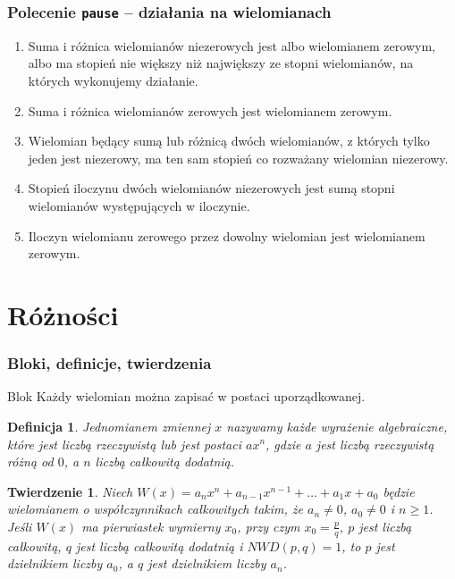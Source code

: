 \documentclass[10pt,xcolor={dvipsnames}]{beamer}
\newtheorem{twierdzenie}{Twierdzenie}
\newtheorem{definicja}{Definicja}
\begin{document}
\begin{frame}[fragile]
\frametitle{Polecenie \texttt{pause} -- działania na wielomianach}
\begin{enumerate}
\item Suma i różnica wielomianów niezerowych jest albo wielomianem zerowym, albo ma stopień nie większy niż największy ze stopni wielomianów, na których wykonujemy działanie.
\pause
\item  Suma i różnica wielomianów zerowych jest wielomianem zerowym.
\pause
\item Wielomian będący sumą lub różnicą dwóch wielomianów, z których tylko jeden jest niezerowy, ma ten sam stopień co rozważany wielomian niezerowy.
\pause
\item Stopień iloczynu dwóch wielomianów niezerowych jest sumą stopni wielomianów występujących w iloczynie.
\pause
\item Iloczyn wielomianu zerowego przez dowolny wielomian jest wielomianem zerowym.
\end{enumerate}
\end{frame}


\section{Różności}


\begin{frame}
\frametitle{Bloki, definicje, twierdzenia}
\begin{block}{Blok}
Każdy wielomian można zapisać w postaci uporządkowanej.
\end{block}

\begin{definicja}
Jednomianem zmiennej $x$ nazywamy każde wyrażenie algebraiczne, które jest liczbą rzeczywistą lub jest postaci $ax^n$, gdzie $a$ jest liczbą rzeczywistą różną od $0$, a $n$ liczbą całkowitą dodatnią. 
\end{definicja}

\begin{twierdzenie}
Niech $W(x)=a_nx^n+a_{n-1}x^{n-1}+\ldots+a_1x+a_0$ będzie wielomianem o współczynnikach całkowitych takim, że $a_n\neq 0$, $a_0\neq 0$ i $n\geq 1$. Jeśli $W(x)$ ma pierwiastek wymierny $x_0$, przy czym $x_0=\frac{p}{q}$, $p$ jest liczbą całkowitą, $q$ jest liczbą całkowitą dodatnią i $NWD(p,q)=1$, to $p$ jest dzielnikiem liczby $a_0$, a $q$ jest dzielnikiem liczby $a_n$. 
\end{twierdzenie}
\end{frame}
\end{document}
